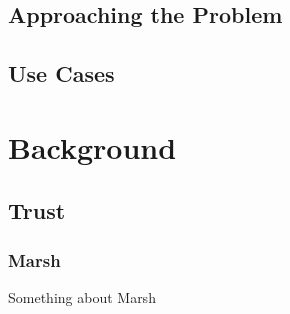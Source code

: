 \subsection*{Approaching the Problem}\label{sec:approaching_the_problem}





\subsection{Use Cases}



\section{Background}
\label{sec:background}

\subsection*{Trust}\label{sec:trust}


\subsubsection*{Marsh}\label{sec:marsh}
Something about Marsh\cite{marsh1994}

